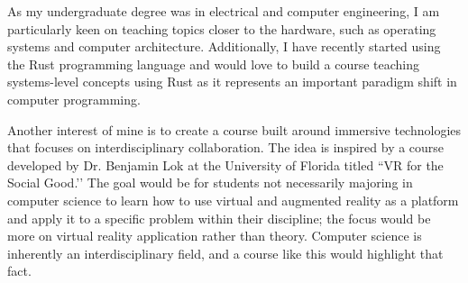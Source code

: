 As my undergraduate degree was in electrical and computer engineering, I am particularly keen on teaching topics closer to the hardware, such as operating systems and computer architecture. Additionally, I have recently started using the Rust programming language and would love to build a course teaching systems-level concepts using Rust as it represents an important paradigm shift in computer programming.

Another interest of mine is to create a course built around immersive technologies that focuses on interdisciplinary collaboration. The idea is inspired by a course developed by Dr. Benjamin Lok at the University of Florida titled ``VR for the Social Good.’’ The goal would be for students not necessarily majoring in computer science to learn how to use virtual and augmented reality as a platform and apply it to a specific problem within their discipline; the focus would be more on virtual reality application rather than theory. Computer science is inherently an interdisciplinary field, and a course like this would highlight that fact.

\label{teaching_last}
